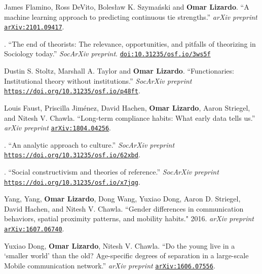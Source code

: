 
\ind James Flamino, Ross DeVito, Boles\l{}aw K. Szyma\'{n}ski and {\bf Omar Lizardo}. ``A machine learning approach to predicting continuous tie strengths.'' {\em arXiv preprint} \href{https://arxiv.org/abs/2101.09417}{\nolinkurl{arXiv:2101.09417}}.
    
. ``The end of theorists: The relevance, opportunities, and pitfalls of theorizing in Sociology today.'' {\em SocArXiv preprint}. \href{https://doi.org/10.31235/osf.io/3ws5f}{\nolinkurl{doi:10.31235/osf.io/3ws5f}}

\ind Dustin S. Stoltz, Marshall A. Taylor and {\bf Omar Lizardo}. ``Functionaries: Institutional theory without institutions.'' {\em SocArXiv preprint} \href{https://doi.org/10.31235/osf.io/p48ft}{\nolinkurl{https://doi.org/10.31235/osf.io/p48ft}}.

\ind Louis Faust, Priscilla Jim\'{e}nez, David Hachen, {\bf Omar Lizardo}, Aaron Striegel, and Nitesh V. Chawla. ``Long-term compliance habits: What early data tells us.'' {\em arXiv preprint} \href{https://arxiv.org/abs/1804.04256}{\nolinkurl{arXiv:1804.04256}}.

. ``An analytic approach to culture.'' {\em SocArXiv preprint} \href{https://doi.org/10.31235/osf.io/62xbd}{\nolinkurl{https://doi.org/10.31235/osf.io/62xbd}}.

. ``Social constructivism and theories of reference.'' {\em SocArXiv preprint} \href{https://doi.org/10.31235/osf.io/x7jqg}{\nolinkurl{https://doi.org/10.31235/osf.io/x7jqg}}.

\ind Yang, Yang, {\bf Omar Lizardo}, Dong Wang, Yuxiao Dong, Aaron D. Striegel, David Hachen, and Nitesh V. Chawla. ``Gender differences in communication behaviors, spatial proximity patterns, and mobility habits." 2016. {\em arXiv preprint} \href{https://arxiv.org/abs/1607.06740}{\nolinkurl{arXiv:1607.06740}}.

\ind Yuxiao Dong, {\bf Omar Lizardo}, Nitesh V. Chawla. ``Do the young live in a `smaller world' than the old? Age-specific degrees of separation in a large-scale Mobile communication network.'' {\em arXiv preprint} \href{https://arxiv.org/abs/1606.07556}{\nolinkurl{arXiv:1606.07556}}.
